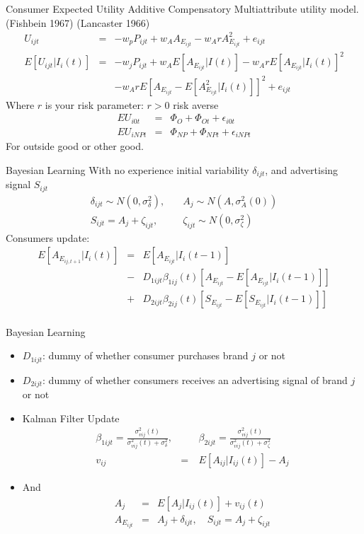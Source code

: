 \begin{frame}{Consumer Expected Utility}
Additive Compensatory Multiattribute utility model. (Fishbein 1967) (Lancaster 1966)
\begin{eqnarray*}
U_{ijt} &=& -w_p P_{ijt} + w_A A_{E_{ijt}} - w_A r A_{E_{ijt}}^2 + e_{ijt}\\
E[U_{ijt} | I_i(t)] &=& -w_j P_{ijt} + w_A E[A_{E_{ijt}} | I(t)] - w_A r E [A_{E_{ijt}} | I_i(t)]^2\\
&&-w_A r E[A_{E_{ijt}} - E[A_{E_{ijt}}^2 | I_i(t)]]^2 + e_{ijt}
\end{eqnarray*}
Where $r$ is your risk parameter:  $r > 0$ risk averse
\begin{eqnarray*}
EU_{i0t}  &=& \Phi_{O} + \Phi_{Ot} + \epsilon_{i0t}\\
EU_{iNPt}  &=& \Phi_{NP} + \Phi_{NPt} + \epsilon_{iNPt}
\end{eqnarray*}
For outside good or other good.
\end{frame}

\begin{frame}{Bayesian Learning}
With no experience initial variability $\delta_{ijt}$, and advertising signal $S_{ijt}$
\begin{eqnarray*}
\delta_{ijt} \sim N(0,\sigma_{\delta}^2),  \quad& A_j \sim N(A,\sigma_A^2(0))\\
S_{ijt} = A_j + \zeta_{ijt}, \quad &\zeta_{ijt} \sim N(0,\sigma_{\zeta}^2)
\end{eqnarray*}
Consumers update:
\begin{eqnarray*}
E[A_{E_{ij,t+1}} | I_i(t)] &=&  E[A_{E_{ijt}} | I_i(t-1)] \\
 &-& D_{1ijt} \beta_{1ij}(t) [A_{E_{ijt}} - E[A_{E_{ijt}} | I_i(t-1)] ] \\
 &+&D_{2ijt} \beta_{2ij}(t) [S_{E_{ijt}} - E[S_{E_{ijt}} | I_i(t-1)] ] \\
\end{eqnarray*}
\end{frame}

\begin{frame}{Bayesian Learning}
\begin{itemize}
\item $D_{1ijt}$: dummy of whether consumer purchases brand $j$ or not
\item $D_{2ijt}$: dummy of whether consumers receives an advertising signal of brand $j$ or not
\item Kalman Filter Update
\begin{eqnarray*}
\beta_{1ijt} = \frac{ \sigma_{vij}^2(t)} { \sigma_{vij}^2(t) + \sigma_{\delta}^2}, &\quad& 
\beta_{2ijt} = \frac{ \sigma_{vij}^2(t)} { \sigma_{vij}^2(t) + \sigma_{\zeta}^2}\\
v_{ij} &=& E[A_{ij} | I_{ij}(t)] - A_j
\end{eqnarray*} 
\item And
\begin{eqnarray*}
A_{j} &=& E[A_j | I_{ij}(t)] + v_{ij}(t)\\
A_{E_{ijt}} &=& A_j + \delta_{ijt} , \quad S_{ijt} = A_j + \zeta_{ijt}
\end{eqnarray*} 
\end{itemize}
\end{frame}

